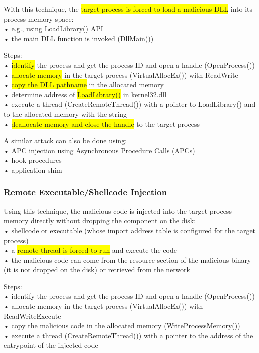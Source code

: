 \documentclass[]{project_plan}
\begin{document}
With this technique, the \colorbox{yellow}{target process is forced to load a malicious DLL} into its process memory
space:\\
• e.g., using LoadLibrary() API\\
• the main DLL function is invoked (DllMain())

Steps:\\
• \colorbox{yellow}{identify} the process and get the process ID and open a handle (OpenProcess())\\
• \colorbox{yellow}{allocate memory} in the target process (VirtualAllocEx()) with ReadWrite\\
• \colorbox{yellow}{copy the DLL pathname} in the allocated memory\\
• determine address of \colorbox{yellow}{LoadLibrary()} in kernel32.dll\\
• execute a thread (CreateRemoteThread()) with a pointer to LoadLibrary() and to the allocated
memory with the string\\
• \colorbox{yellow}{deallocate memory and close the handle} to the target process

A similar attack can also be done using:\\
• APC injection using Asynchronous Procedure Calls (APCs)\\
• hook procedures\\
• application shim

\subsubsection{Remote Executable/Shellcode Injection}

Using this technique, the malicious code is injected into the target process memory directly
without dropping the component on the disk:\\
• shellcode or executable (whose import address table is configured for the target process)\\
• a \colorbox{yellow}{remote thread is forced to run} and execute the code\\
• the malicious code can come from the resource section of the malicious binary (it is not dropped on the disk)
or retrieved from the network

Steps:\\
• identify the process and get the process ID and open a handle (OpenProcess())\\
• allocate memory in the target process (VirtualAllocEx()) with ReadWriteExecute\\
• copy the malicious code in the allocated memory (WriteProcessMemory())\\
• execute a thread (CreateRemoteThread()) with a pointer to the address of the entrypoint of the
injected code
\end{document}
